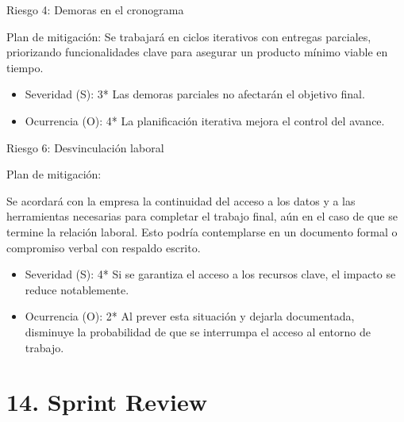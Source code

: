 \documentclass[
11pt, %
]{charter}
\begin{document}
Riesgo 4: Demoras en el cronograma

Plan de mitigación:
Se trabajará en ciclos iterativos con entregas parciales, priorizando funcionalidades clave para asegurar un producto mínimo viable en tiempo.

\begin{itemize}
\item Severidad (S): 3*
Las demoras parciales no afectarán el objetivo final.

\item Ocurrencia (O): 4*
La planificación iterativa mejora el control del avance.
\end{itemize}

Riesgo 6: Desvinculación laboral

Plan de mitigación:

Se acordará con la empresa la continuidad del acceso a los datos y a las herramientas necesarias para completar el trabajo final, aún en el caso de que se termine la relación laboral. Esto podría contemplarse en un documento formal o compromiso verbal con respaldo escrito.

\begin{itemize}
	\item Severidad (S): 4*
Si se garantiza el acceso a los recursos clave, el impacto se reduce notablemente.

	\item Ocurrencia (O): 2*
Al prever esta situación y dejarla documentada, disminuye la probabilidad de que se interrumpa el acceso al entorno de trabajo.
\end{itemize}

















\section{14. Sprint Review}
\label{sec:sprint_review}
\end{document}
